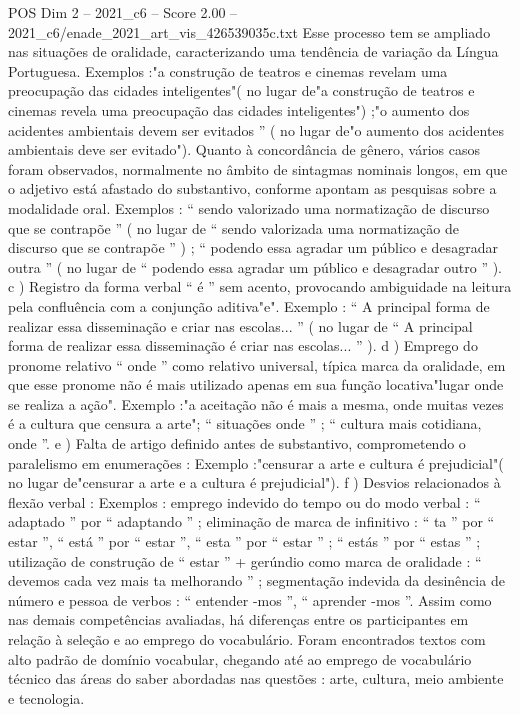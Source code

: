 \begin{textsample}{POS Dim 2 – 2021\_c6 – Score 2.00 – 2021\_c6/enade\_2021\_art\_vis\_426539035c.txt}
Esse processo tem se ampliado nas situações de oralidade, caracterizando uma tendência de variação da Língua Portuguesa.
Exemplos :"a construção de teatros e cinemas revelam uma preocupação das cidades inteligentes"( no lugar de"a construção de teatros e cinemas revela uma preocupação das cidades inteligentes") ;"o aumento dos acidentes ambientais devem ser evitados ” ( no lugar de"o aumento dos acidentes ambientais deve ser evitado").
Quanto à concordância de gênero, vários casos foram observados, normalmente no âmbito de sintagmas nominais longos, em que o adjetivo está afastado do substantivo, conforme apontam as pesquisas sobre a modalidade oral.
Exemplos : “ sendo valorizado uma normatização de discurso que se contrapõe ” ( no lugar de “ sendo valorizada uma normatização de discurso que se contrapõe ” ) ; “ podendo essa agradar um público e desagradar outra ” ( no lugar de “ podendo essa agradar um público e desagradar outro ” ). c ) Registro da forma verbal “ é ” sem acento, provocando ambiguidade na leitura pela confluência com a conjunção aditiva"e".
Exemplo : “ A principal forma de realizar essa disseminação e criar nas escolas... ” ( no lugar de “ A principal forma de realizar essa disseminação é criar nas escolas... ” ). d ) Emprego do pronome relativo “ onde ” como relativo universal, típica marca da oralidade, em que esse pronome não é mais utilizado apenas em sua função locativa"lugar onde se realiza a ação".
Exemplo :"a aceitação não é mais a mesma, onde muitas vezes é a cultura que censura a arte"; “ situações onde ” ; “ cultura mais cotidiana, onde ”. e ) Falta de artigo definido antes de substantivo, comprometendo o paralelismo em enumerações : Exemplo :"censurar a arte e cultura é prejudicial"( no lugar de"censurar a arte e a cultura é prejudicial"). f ) Desvios relacionados à flexão verbal : Exemplos : emprego indevido do tempo ou do modo verbal : “ adaptado ” por “ adaptando ” ; eliminação de marca de infinitivo : “ ta ” por “ estar ”, “ está ” por “ estar ”, “ esta ” por “ estar ” ; “ estás ” por “ estas ” ; utilização de construção de “ estar ” + gerúndio como marca de oralidade : “ devemos cada vez mais ta melhorando ” ; segmentação indevida da desinência de número e pessoa de verbos : “ entender -mos ”, “ aprender -mos ”.
Assim como nas demais competências avaliadas, há diferenças entre os participantes em relação à seleção e ao emprego do vocabulário.
Foram encontrados textos com alto padrão de domínio vocabular, chegando até ao emprego de vocabulário técnico das áreas do saber abordadas nas questões : arte, cultura, meio ambiente e tecnologia.

\end{textsample}
